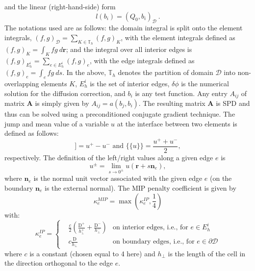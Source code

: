 \documentclass[preprint,10pt]{elsarticle}
\newcommand\br{\mathbf{r}}
\newcommand\bs{\boldsymbol}
\newcommand\mc{\mathcal}
\renewcommand{\(}{\left(}
\renewcommand{\)}{\right)}
\renewcommand{\[}{\left[}
\renewcommand{\]}{\right]}
\newcommand\vn{\bs{n}}
\newcommand{\jmp}[1]{[\![#1]\!]}                     %
\newcommand{\mvl}[1]{\{\!\!\{#1\}\!\!\}}             %
\begin{document}
%
and the linear (right-hand-side) form
%
\begin{equation}
l(b_i) = (Q_0,b_i)_{\mc{D}}\ . 
\label{mip_l}
\end{equation}
%
The notations used are as follows:
the domain integral is split onto the element integrals, $(f,g)_{\mc{D}} = \sum_{K\in \mathbb{T}_h} \(f,g\)_K$, with the element integrals defined as 
$(f,g)_K = \int_K fg\ d\br$; and 
the integral over all interior edges is $(f,g)_{E_h^i}=\sum_{e\in E_h^i}(f,g)_e$, with the edge integrals defined as 
$(f,g)_e = \int_e fg\ ds$. In the above, 
 $\mathbb{T}_h$ denotes the partition of domain
$\mc{D}$ into non-overlapping elements $K$, $E_h^i$ is the set of interior
edges, $\delta \phi$ is the numerical solution for the diffusion correction, and $b_i$ is any test function.
Any entry $A_{ij}$ of matrix $\bs{A}$ is simply given by $A_{ij}= a(b_j,b_i)$. The resulting matrix $\bs{A}$ is SPD
\cite{Arnold1982,arnold2000discontinuous} and thus can be solved using a preconditioned conjugate gradient technique.
%
The jump and mean value of a variable $u$  at the interface between two elements is defined as follows:
%
\begin{equation}
\jmp{u} = u^+ - u^- \text{ and } \mvl{u} = \frac{u^+ + u^-}{2} ,
\end{equation}
respectively.
%
The definition of the left/right values along a given edge $e$ is
%
\begin{equation}
u^{\pm}= \lim_{s\rightarrow 0^{\pm}}u(\bs{r}+s\vn_e) ,
\end{equation}
%
where $\vn_e$ is the normal unit vector associated with the given edge $e$
(on the boundary $\vn_e$ is the external normal).
%
The MIP penalty coefficient is given by
%
\begin{equation}
\kappa_e^{MIP} = \max\(\kappa_e^{IP},\frac{1}{4}\)
\end{equation}
with:
\begin{equation}
\kappa_e^{IP} = \left\{
\begin{aligned}
&\frac{c}{2} \left( \frac{\mathrm{D^+}}{h_{\bot}^+} + \frac{\mathrm{D}^-}{h_{\bot}^-} \right) & \textrm{on interior edges, i.e., for }
e\in E_h^i\\
&c \frac{\mathrm{D}}{h_{\bot}} & \textrm{on boundary edges, i.e., for } e
\in\partial \mc{D} %
\end{aligned}
\right. 
\end{equation}
%
where $c$ is a constant (chosen equal to 4 here) and $h_{\bot}$ is the length of the cell in the direction
orthogonal to the edge $e$. 
\end{document}
